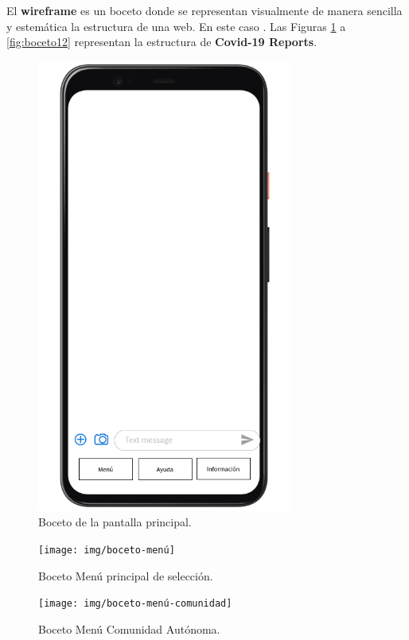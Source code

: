 El \textbf{wireframe} es un boceto donde se representan visualmente de manera sencilla y estemática la estructura de una web. En este caso . Las Figuras \ref{fig:boceto1} a \ref{fig:boceto12} representan la estructura de \textbf{Covid-19 Reports}.

\begin{figure}[H]
	\centering
	\includegraphics[width=0.75\textwidth]{img/boceto-inicio}
	\caption{Boceto de la pantalla principal.}
	\label{fig:boceto1}
\end{figure}

\begin{figure}[p]
	\centering
	\texttt{[image: img/boceto-menú]}
	\caption{Boceto Menú principal de selección.}
	\label{fig:boceto2}
\end{figure}

\begin{figure}[p]
	\centering
	\texttt{[image: img/boceto-menú-comunidad]}
	\caption{Boceto Menú Comunidad Autónoma.}
	\label{fig:boceto3}
\end{figure}

